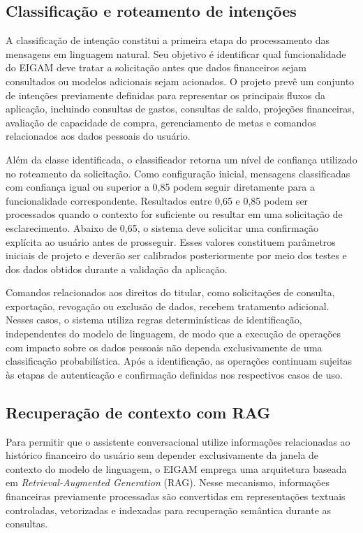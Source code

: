\subsection{Classificação e roteamento de intenções}

A classificação de intenção constitui a primeira etapa do processamento das mensagens em linguagem natural. Seu objetivo é identificar qual funcionalidade do EIGAM deve tratar a solicitação antes que dados financeiros sejam consultados ou modelos adicionais sejam acionados. O projeto prevê um conjunto de intenções previamente definidas para representar os principais fluxos da aplicação, incluindo consultas de gastos, consultas de saldo, projeções financeiras, avaliação de capacidade de compra, gerenciamento de metas e comandos relacionados aos dados pessoais do usuário.

Além da classe identificada, o classificador retorna um nível de confiança utilizado no roteamento da solicitação. Como configuração inicial, mensagens classificadas com confiança igual ou superior a 0,85 podem seguir diretamente para a funcionalidade correspondente. Resultados entre 0,65 e 0,85 podem ser processados quando o contexto for suficiente ou resultar em uma solicitação de esclarecimento. Abaixo de 0,65, o sistema deve solicitar uma confirmação explícita ao usuário antes de prosseguir. Esses valores constituem parâmetros iniciais de projeto e deverão ser calibrados posteriormente por meio dos testes e dos dados obtidos durante a validação da aplicação.

Comandos relacionados aos direitos do titular, como solicitações de consulta, exportação, revogação ou exclusão de dados, recebem tratamento adicional. Nesses casos, o sistema utiliza regras determinísticas de identificação, independentes do modelo de linguagem, de modo que a execução de operações com impacto sobre os dados pessoais não dependa exclusivamente de uma classificação probabilística. Após a identificação, as operações continuam sujeitas às etapas de autenticação e confirmação definidas nos respectivos casos de uso.

\subsection{Recuperação de contexto com RAG}

Para permitir que o assistente conversacional utilize informações relacionadas ao histórico financeiro do usuário sem depender exclusivamente da janela de contexto do modelo de linguagem, o EIGAM emprega uma arquitetura baseada em \textit{Retrieval-Augmented Generation} (RAG). Nesse mecanismo, informações financeiras previamente processadas são convertidas em representações textuais controladas, vetorizadas e indexadas para recuperação semântica durante as consultas.

